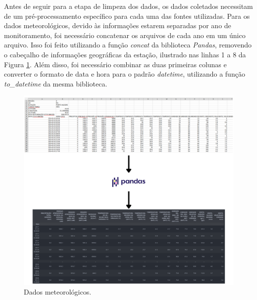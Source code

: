 Antes de seguir para a etapa de limpeza dos dados, os dados coletados necessitam de um pré-processamento específico para cada uma das fontes utilizadas. Para os dados meteorológicos, devido às informações estarem separadas por ano de monitoramento, foi necessário concatenar os arquivos de cada ano em um único arquivo. Isso foi feito utilizando a função \textit{concat} da biblioteca \textit{Pandas}, removendo o cabeçalho de informações geográficas da estação, ilustrado nas linhas 1 a 8 da Figura \ref{fig:base_inmet}. Além disso, foi necessário combinar as duas primeiras colunas e converter o formato de data e hora para o padrão \textit{datetime}, utilizando a função \textit{to\_datetime} da mesma biblioteca. 

\begin{figure}[H]
	\caption{\label{fig:base_inmet}Dados meteorológicos.}
	\begin{center}
		\includegraphics[scale=0.3]{figuras/base_inmet.png}
	\end{center}
\end{figure}
\pagebreak

